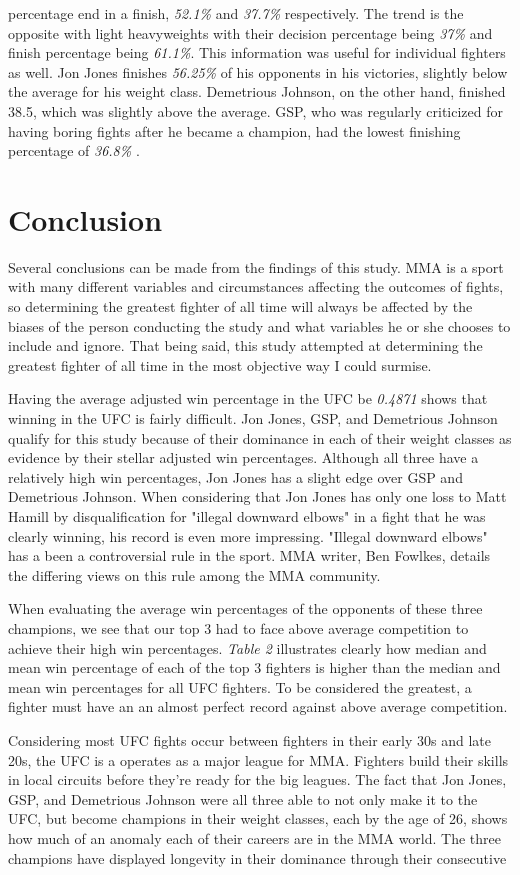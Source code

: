 \documentclass[12pt,english]{report}
\begin{document}
percentage end in a finish, \textit{52.1\%} and \textit{37.7\%} respectively. The trend is the opposite with light heavyweights with their decision percentage being \textit{37\%} and finish percentage being \textit{61.1\%}. This information was useful for individual fighters as well. Jon Jones finishes \textit{56.25\%} of his opponents in his victories, slightly below the average for his weight class. Demetrious Johnson, on the other hand, finished 38.5, which was slightly above the average. GSP, who was regularly criticized for having boring fights after he became a champion, had the lowest finishing percentage of \textit{36.8\%} \cite{kim_da2011}. 
\section{Conclusion}
Several conclusions can be made from the findings of this study. MMA is a sport with many different variables and circumstances affecting the outcomes of fights, so determining the greatest fighter of all time will always be affected by the biases of the person conducting the study and what variables he or she chooses to include and ignore. That being said, this study attempted at determining the greatest fighter of all time in the most objective way I could surmise. \par Having the average adjusted win percentage in the UFC be \textit{0.4871} shows that winning in the UFC is fairly difficult. Jon Jones, GSP, and Demetrious Johnson qualify for this study because of their dominance in each of their weight classes as evidence by their stellar adjusted win percentages. Although all three have a relatively high win percentages, Jon Jones has a slight edge over GSP and Demetrious Johnson. When considering that Jon Jones has only one loss to Matt Hamill by disqualification for "illegal downward elbows" in a fight that he was clearly winning, his record is even more impressing. "Illegal downward elbows" has a been a controversial rule in the sport. MMA writer, Ben Fowlkes, details the differing views on this rule among the MMA community. \cite{fowlkes_2014} \par When evaluating the average win percentages of the opponents of these three champions, we see that our top 3 had to face above average competition to achieve their high win percentages. \textit{Table 2} illustrates clearly how median and mean win percentage of each of the top 3 fighters is higher than the median and mean win percentages for all UFC fighters. To be considered the greatest, a fighter must have an an almost perfect record against above average competition. \par Considering most UFC fights occur between fighters in their early 30s and late 20s, the UFC is a operates as a major league for MMA. Fighters build their skills in local circuits before they're ready for the big leagues. The fact that Jon Jones, GSP, and Demetrious Johnson were all three able to not only make it to the UFC, but become champions in their weight classes, each by the age of 26, shows how much of an anomaly each of their careers are in the MMA world. The three champions have displayed longevity in their dominance through their consecutive 
\end{document}
